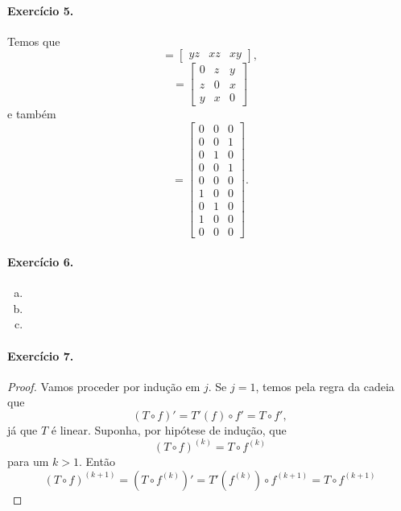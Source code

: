 \documentclass[12pt,a4paper]{article}
\begin{document}
\paragraph{Exercício 5.}
%
Temos que
%
\begin{equation*}
    [f'(x,y,z)] = 
    \begin{bmatrix}
        yz & xz & xy
    \end{bmatrix},
\end{equation*}
%
\begin{equation*}
    [f''(x,y,z)] =
    \begin{bmatrix}
        0 & z & y \\
        z & 0 & x \\
        y & x & 0
    \end{bmatrix}
\end{equation*}
%
e também
\begin{equation*}
    [f'''(x,y,z)] = 
    \begin{bmatrix}
        0 & 0 & 0 \\
        0 & 0 & 1 \\
        0 & 1 & 0 \\
        0 & 0 & 1 \\
        0 & 0 & 0 \\
        1 & 0 & 0 \\
        0 & 1 & 0 \\
        1 & 0 & 0 \\
        0 & 0 & 0
    \end{bmatrix}.
\end{equation*}
%
\paragraph{Exercício 6.}
%
\begin{enumerate}[a)]
    \item 
    \item
    \item
\end{enumerate}
%
\paragraph{Exercício 7.}
%
\begin{proof}
    Vamos proceder por indução em $j$. Se $j=1$, temos pela regra da cadeia que
    \begin{equation*}
        (T\circ f)' = T'(f)\circ f' = T\circ f',
    \end{equation*}
    já que $T$ é linear. Suponha, por hipótese de indução, que
    \begin{equation*}
        (T\circ f)^{(k)} = T\circ f^{(k)}
    \end{equation*}
    para um $k>1$. Então
    \begin{equation*}
        (T\circ f)^{(k+1)} = (T\circ f^{(k)})' = T'(f^{(k)})\circ f^{(k+1)} = T\circ f^{(k+1)}
    \end{equation*}
\end{proof}
%
\end{document}
